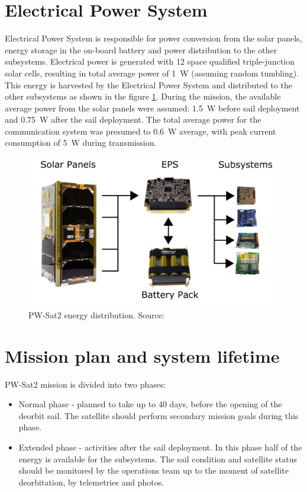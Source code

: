 \section{Electrical Power System}
Electrical Power System is responsible for power conversion from the solar panels, energy storage in the on-board battery and power distribution to the other subsystems. Electrical power is generated with \si{12} space qualified triple-junction solar cells, resulting in total average power of \SI{1}{\watt} (assuming random tumbling). This energy is harvested by the Electrical Power System and distributed to the other subsystems as shown in the figure \ref{pwsat_eps_distribution}. During the mission, the available average power from the solar panels were assumed: \SI{1.5}{\watt} before sail deployment and \SI{0.75}{\watt} after the sail deployment. The total average power for the communication system was presumed to \SI{0.6}{\watt} average, with peak current consumption of \SI{5}{\watt} during transmission.
\begin{figure}
    \centering
    \includegraphics[width=0.7\paperwidth]{img/2/pwsat_eps_distribution.png}
    \caption{PW-Sat2 energy distribution. Source: \cite{PW_sat2_photo}}
    \label{pwsat_eps_distribution}
\end{figure}

\section{Mission plan and system lifetime}
PW-Sat2 mission is divided into two phases:
\begin{itemize}
    \item Normal phase - planned to take up to 40 days, before the opening of the deorbit sail. The satellite should perform secondary mission goals during this phase.
    \item Extended phase - activities after the sail deployment. In this phase half of the energy is available for the subsystems. The sail condition and satellite status should be monitored by the operations team up to the moment of satellite deorbitation, by telemetries and photos.
\end{itemize}
